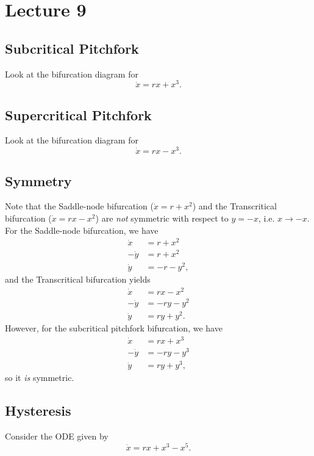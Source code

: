 \documentclass[class=article, crop=false]{standalone}
\begin{document}
  \section{Lecture 9}
  \subsection{Subcritical Pitchfork}
  Look at the bifurcation diagram for
  \[
    \dot{x} = rx + x^3.
  \]
  \subsection{Supercritical Pitchfork}
  Look at the bifurcation diagram for
  \[
    \dot{x} = rx - x^3.
  \]
  \subsection{Symmetry}
  Note that the Saddle-node bifurcation ($\dot{x} = r + x^2$) and the Transcritical bifurcation ($\dot{x} = rx - x^2$) are \emph{not} symmetric with respect to $y = -x$, i.e. $x\to -x$. For the Saddle-node bifurcation, we have
  \begin{align*}
    \dot{x} &= r + x^2 \\
    -\dot{y} &= r + x^2 \\
    \dot{y} &= -r - y^2,
  \end{align*}
  and the Transcritical bifurcation yields
  \begin{align*}
    \dot{x} &= rx - x^2 \\
    -\dot{y} &= -ry - y^2 \\
    \dot{y} &= ry + y^2.
  \end{align*}
  However, for the subcritical pitchfork bifurcation, we have
  \begin{align*}
    \dot{x} &= rx + x^3 \\
    -\dot{y} &= -ry - y^3 \\
    \dot{y} &= ry + y^3,
  \end{align*}
  so it \emph{is} symmetric.
  \subsection{Hysteresis}
  Consider the ODE given by
  \[
    \dot{x} = rx + x^3 - x^5.
  \]
\end{document}
